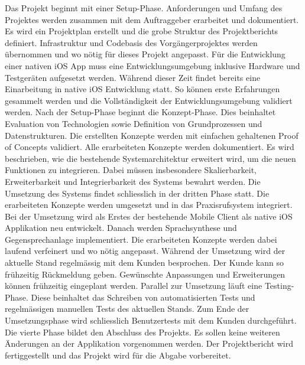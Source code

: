 Das Projekt beginnt mit einer Setup-Phase.
Anforderungen und Umfang des Projektes werden zusammen mit dem Auftraggeber erarbeitet und dokumentiert.
Es wird ein Projektplan erstellt und die grobe Struktur des Projektberichts definiert.
Infrastruktur und Codebasis des Vorgängerprojektes werden übernommen und wo nötig für dieses Projekt angepasst.
Für die Entwicklung einer nativen iOS App muss eine Entwicklungsumgebung inklusive Hardware und Testgeräten aufgesetzt werden.
Während dieser Zeit findet bereits eine Einarbeitung in native iOS Entwicklung statt.
So können erste Erfahrungen gesammelt werden und die Vollständigkeit der Entwicklungsumgebung validiert werden.
Nach der Setup-Phase beginnt die Konzept-Phase.
Dies beinhaltet Evaluation von Technologien sowie Definition von Grundprozessen und Datenstrukturen.
Die erstellten Konzepte werden mit einfachen gehaltenen Proof of Concepts validiert.
Alle erarbeiteten Konzepte werden dokumentiert.
Es wird beschrieben, wie die bestehende Systemarchitektur erweitert wird, um die neuen Funktionen zu integrieren.
Dabei müssen insbesondere Skalierbarkeit, Erweiterbarkeit und Integrierbarkeit des Systems bewahrt werden.
Die Umsetzung des Systems findet schliesslich in der dritten Phase statt.
Die erarbeiteten Konzepte werden umgesetzt und in das Praxisrufsystem integriert.
Bei der Umsetzung wird als Erstes der bestehende Mobile Client als native iOS Applikation neu entwickelt.
Danach werden Sprachsynthese und Gegensprechanlage implementiert.
Die erarbeiteten Konzepte werden dabei laufend verfeinert und wo nötig angepasst.
Während der Umsetzung wird der aktuelle Stand regelmässig mit dem Kunden besprochen.
Der Kunde kann so frühzeitig Rückmeldung geben.
Gewünschte Anpassungen und Erweiterungen können frühzeitig eingeplant werden.
Parallel zur Umsetzung läuft eine Testing-Phase.
Diese beinhaltet das Schreiben von automatisierten Tests und regelmässigen manuellen Tests des aktuellen Stands.
Zum Ende der Umsetzungsphase wird schliesslich Benutzertests mit dem Kunden durchgeführt.
Die vierte Phase bildet den Abschluss des Projekts.
Es sollen keine weiteren Änderungen an der Applikation vorgenommen werden.
Der Projektbericht wird fertiggestellt und das Projekt wird für die Abgabe vorbereitet.

